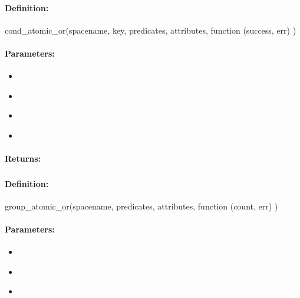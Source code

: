 \paragraph{Definition:}
\begin{javascriptcode}
cond_atomic_or(spacename, key, predicates, attributes, function (success, err) {})
\end{javascriptcode}
\paragraph{Parameters:}
\begin{itemize}[noitemsep]
\item {}\\

\item {}\\

\item {}\\

\item {}\\

\end{itemize}

\paragraph{Returns:}


\pagebreak
\subsubsection{}
\label{api:nodejs:group_atomic_or}


\paragraph{Definition:}
\begin{javascriptcode}
group_atomic_or(spacename, predicates, attributes, function (count, err) {})
\end{javascriptcode}
\paragraph{Parameters:}
\begin{itemize}[noitemsep]
\item {}\\

\item {}\\

\item {}\\

\end{itemize}


